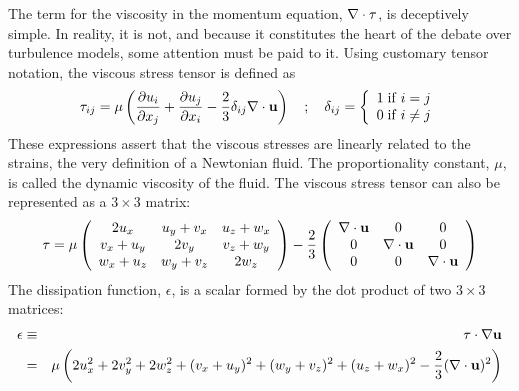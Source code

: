 \documentclass[graybox]{svmult}
\begin{document}
The term for the viscosity in the momentum equation, $\nabla \cdot \tens{\tau}$, is deceptively simple. In reality, it is not, and because it constitutes the heart of the debate over turbulence models, some attention must be paid to it. Using customary tensor notation, the viscous stress tensor is defined as
\begin{equation}
\tens{\tau}_{ij} = \mu \left( \frac{\partial u_i}{\partial x_j} + \frac{\partial u_j}{\partial x_i} - \frac{2}{3} \delta_{ij} \nabla \cdot \mathbf{u} \right) \quad ; \quad \delta_{ij} = \left\{ \begin{array}{l} 1 \; \mathrm{if} \; i=j \\ 0 \; \mathrm{if} \; i\neq j \end{array} \right.
\end{equation}
These expressions assert that the viscous stresses are linearly related to the strains, the very definition of a Newtonian fluid. The proportionality constant, $\mu$, is called the dynamic viscosity of the fluid. The viscous stress tensor can also be represented as a $3 \times 3$ matrix:
\begin{equation}
\tens{\tau} = \mu \left( \begin{array}{ccc} 2u_x & u_y+v_x & u_z+w_x \\ v_x+u_y & 2v_y & v_z+w_y \\ w_x+u_z & w_y+v_z & 2w_z \end{array} \right) -
              \frac{2}{3} \left( \begin{array}{ccc} \nabla \cdot \mathbf{u} & 0 & 0 \\ 0 & \nabla \cdot \mathbf{u} & 0 \\ 0 & 0 & \nabla \cdot \mathbf{u} \end{array} \right)
\end{equation}
The dissipation function, $\epsilon$, is a scalar formed by the dot product of two $3 \times 3$ matrices:
\begin{eqnarray}
\epsilon &\equiv& \tens{\tau} \cdot \nabla \mathbf{u} \nonumber  \\
         &=& \mu \left( 2u_x^2 + 2v_y^2 + 2w_z^2 + (v_x+u_y)^2 + (w_y+v_z)^2 + (u_z+w_x)^2 - \frac{2}{3} (\nabla \cdot \mathbf{u})^2 \right)
\end{eqnarray}
\end{document}
